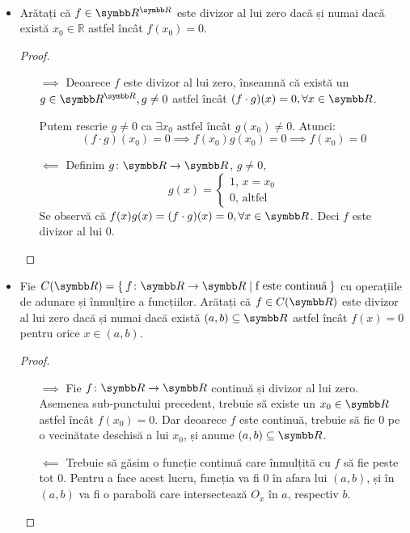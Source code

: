 \begin{exercise}[1.15]
~
\begin{itemize}
    \item Arătați că \(f \in \reals^{\reals}\) este divizor al lui zero dacă și numai dacă există \(x_0 \in \mathbb{R}\) astfel încât \(f(x_0) = 0\).
    \begin{proof}
    \begin{itemize}
        \item[\(\implies\)] Deoarece \(f\) este divizor al lui zero, înseamnă că există un \(g \in \reals^{\reals}, g \neq 0\) astfel încât \((f \cdot g)(x) = 0, \forall x \in \reals\).
        
        Putem rescrie \(g \neq 0\) ca \(\exists x_0 \text{ astfel încât } g(x_0) \neq 0\). Atunci:
        \[
        (f \cdot g)(x_0) = 0 \implies f(x_0) g(x_0) = 0 \implies f(x_0) = 0
        \]
        
        \item[\(\impliedby\)] Definim \(g \colon \reals \to \reals\), \(g \neq 0\),
        \[
        g(x) = \begin{cases}
            1, \, x = x_0 \\
            0, \, \text{altfel}
        \end{cases}
        \]
        Se observă că \(f(x)g(x) = (f \cdot g)(x) = 0, \forall x \in \reals\). Deci \(f\) este divizor al lui 0.
    \end{itemize}
    \end{proof}
    \item Fie \(C(\reals) = \Set{f \colon \reals \to \reals | \text{f este continuă}}\)
    cu operațiile de adunare și înmulțire a funcțiilor.
    Arătați că \(f \in C(\reals)\) este divizor al lui zero dacă și numai dacă
    există \((a, b) \subseteq \reals\) astfel încât \(f(x) = 0\) pentru orice \(x \in (a, b)\).
    \begin{proof}
    \begin{itemize}
        \item[\(\implies\)] Fie \(\function{f}{\reals}{\reals}\) continuă și divizor al lui zero. Asemenea sub-punctului precedent, trebuie să existe un \(x_0 \in \reals\) astfel încât \(f(x_0) = 0\). Dar deoarece \(f\) este continuă, trebuie să fie 0 pe o vecinătate deschisă a lui \(x_0\), și anume \((a, b) \subseteq \reals\).
        
        \item[\(\impliedby\)] Trebuie să găsim o funcție continuă care înmulțită cu \(f\) să fie peste tot 0. Pentru a face acest lucru, funcția va fi 0 în afara lui \((a, b)\), și în \((a, b)\) va fi o parabolă care intersectează \(O_x\) în \(a\), respectiv \(b\).
        

\end{itemize}
\end{proof}
\end{itemize}
\end{exercise}
